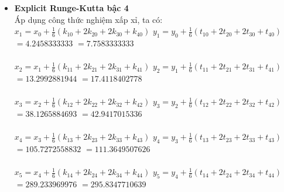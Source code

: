 \documentclass[a4paper]{article}
\begin{document}
\begin{flushleft}
    \begin{itemize}
        \item \textbf{Explicit Runge-Kutta bậc 4 \\}
        Áp dụng công thức nghiệm xấp xỉ, ta có: \\
            $x_1=x_0+\frac{1}{6}(k_{10}+2k_{20}+2k_{30}+k_{40})$ \hspace*{2.5cm} $y_1=y_0+\frac{1}{6}(t_{10}+2t_{20}+2t_{30} + t_{40})$ \\
            \hspace*{.33cm} $=4.2458333333$ \hspace{5.75cm} $=7.7583333333$ \\
            \\
            $x_2=x_1+\frac{1}{6}(k_{11}+2k_{21}+2k_{31}+k_{41})$ \hspace*{2.5cm} $y_2=y_1+\frac{1}{6}(t_{11}+2t_{21}+2t_{31}+t_{41})$ \\
            \hspace*{.33cm} $=13.2992881944$ \hspace*{5.58cm} $=17.4118402778$ \\
            \\
            $x_3=x_2+\frac{1}{6}(k_{12}+2k_{22}+2k_{32}+k_{42})$ \hspace*{2.5cm} $y_3=y_2+\frac{1}{6}(t_{12}+2t_{22}+2t_{32}+t_{42})$ \\
            \hspace*{.33cm} $=38.1265884693$ \hspace*{5.58cm} $=42.9417015336$ \\
            \\
            $x_4=x_3+\frac{1}{6}(k_{13}+2k_{23}+2k_{33}+k_{43})$ \hspace*{2.5cm} $y_4=y_3+\frac{1}{6}(t_{13}+2t_{23}+2t_{33}+t_{43})$ \\
            \hspace*{.33cm} $=105.7272558832$ \hspace*{5.4cm} $=111.3649507626$ \\
            \\
            $x_5=x_4+\frac{1}{6}(k_{14}+2k_{24}+2k_{34}+k_{44})$ \hspace*{2.5cm} $y_5=y_4+\frac{1}{6}(t_{14}+2t_{24}+2t_{34}+t_{44})$ \\
            \hspace*{.33cm} $=289.233969976$ \hspace*{5.58cm} $=295.8347710639$
    \end{itemize}
    

\end{flushleft}
\end{document}
